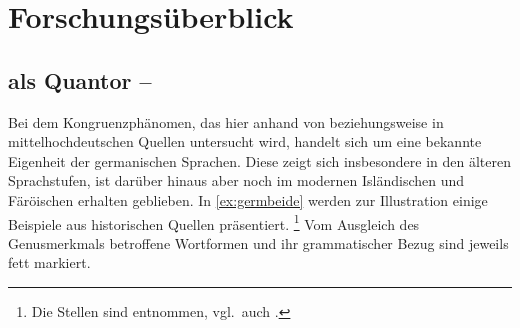 \chapter{Forschungsüberblick}
\label{ch:forschungsueberblick}

\section%
	{ als Quantor -- }
\label{sec:ovwbeidequant}

Bei dem Kongruenzphänomen, das hier anhand von 
 beziehungsweise 
 in mittelhochdeutschen Quellen untersucht
wird, handelt sich um eine bekannte Eigenheit der germanischen Sprachen. Diese
zeigt sich insbesondere in den älteren Sprachstufen, ist darüber hinaus aber
noch im modernen Isländischen \autocites[283]{corbett1991}[569]{wechsler2009}
und Färöischen \autocite[225--226]{thrainsson2004} erhalten geblieben. In
\cref{ex:germbeide} werden zur Illustration einige Beispiele aus historischen
Quellen präsentiert.%
%
	\footnote{Die Stellen sind \citet[12]{askedal1973} entnommen, vgl.~auch
		\citet{hock2008,hock2009}.}
%
Vom Ausgleich des Genusmerkmals betroffene Wortformen und ihr grammatischer
Bezug sind jeweils fett markiert.

